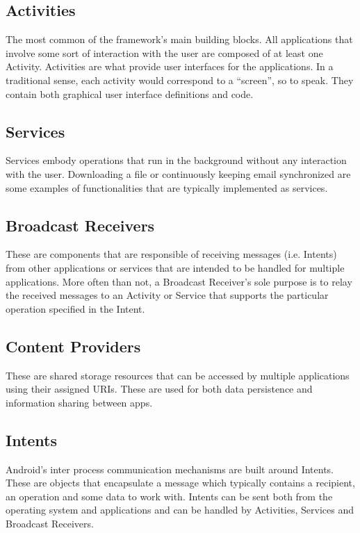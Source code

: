 \documentclass[conference]{IEEEtran}
\begin{document}
\subsection{Activities}

The most common of the framework's main building blocks. All applications that involve some sort of interaction with the user are composed of at least one Activity. Activities are what provide user interfaces for the applications. In a traditional sense, each activity would correspond to a “screen”, so to speak. They contain both graphical user interface definitions and code.

\subsection{Services}

Services embody operations that run in the background without any interaction with the user. Downloading a file or continuously keeping email synchronized are some examples of functionalities that are typically implemented as services.

\subsection{Broadcast Receivers}

These are components that are responsible of receiving messages (i.e. Intents) from other applications or services that are intended to be handled for multiple applications. More often than not, a Broadcast Receiver's sole purpose is to relay the received messages to an Activity or Service that supports the particular operation specified in the Intent.

\subsection{Content Providers}

These are shared storage resources that can be accessed by multiple applications using their assigned URIs. These are used for both data persistence and information sharing between apps.

\subsection{Intents}

Android's inter process communication mechanisms are built around Intents. These are objects that encapsulate a message which typically contains a recipient, an operation and some data to work with. Intents can be sent both from the operating system and applications and can be handled by Activities, Services and Broadcast Receivers.
\end{document}
